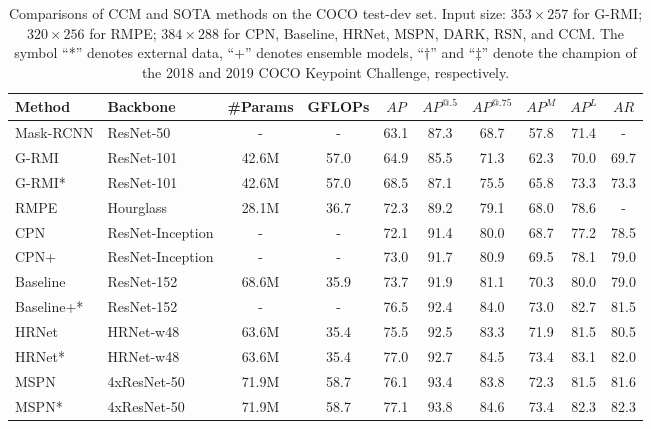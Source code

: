 \documentclass[twocolumn]{svjour3}          \smartqed  \usepackage{natbib}
\begin{document}
\begin{table*}[htbp]
\centering
  \caption{Comparisons of CCM and SOTA methods on the COCO test-dev set. Input size: $353\times257$ for G-RMI; $320\times256$ for RMPE; $384\times288$ for CPN, Baseline, HRNet, MSPN, DARK, RSN, and CCM. The symbol ``*'' denotes external data, ``+'' denotes ensemble models, ``$\dagger$'' and ``$\ddagger$'' denote the champion of the 2018 and 2019 COCO Keypoint Challenge, respectively.}
    \begin{tabular}{llcccccccc}
\toprule
      Method  & Backbone & \#Params & GFLOPs & $AP$    & $AP^{@.5}$  & $AP^{@.75}$  & $AP^M$   & $AP^L$   & $AR$ \\
    \midrule
    Mask-RCNN \citep{he2017mask} & ResNet-50 &  - & - & 63.1    &  87.3     &  68.7     &  57.8    &  71.4     & - \\
    G-RMI \citep{papandreou2017towards} & ResNet-101   &42.6M & 57.0  &64.9   & 85.5      &  71.3     &   62.3    &   70.0    &   69.7 \\
    G-RMI* \citep{papandreou2017towards} & ResNet-101  &42.6M & 57.0   &68.5    &87.1      &75.5       &  65.8     &   73.3     & 73.3 \\
    RMPE \citep{fang2017rmpe} & Hourglass & 28.1M & 36.7 &72.3      &89.2     &79.1       &68.0       &78.6         &- \\
    CPN \citep{chen2018cascaded} & ResNet-Inception & - & -   &72.1      &91.4      &80.0     &68.7        &77.2         &78.5 \\
    CPN+ \citep{chen2018cascaded} & ResNet-Inception & - & -   &73.0     & 91.7    &80.9       &69.5       &78.1         &79.0 \\
    Baseline \citep{xiao2018simple} & ResNet-152 & 68.6M & 35.9 & 73.7     &  91.9     &  81.1     &  70.3     &  80.0     & 79.0 \\
    Baseline+* \citep{xiao2018simple} & ResNet-152 & - & - & 76.5     &  92.4     &  84.0     &  73.0     & 82.7     & 81.5 \\
    HRNet \citep{sun2019deep} & HRNet-w48 & 63.6M & 35.4 & 75.5     &  92.5     &  83.3     &  71.9     &  81.5    & 80.5 \\
    HRNet* \citep{sun2019deep} & HRNet-w48 &  63.6M & 35.4 & 77.0   &  92.7     &  84.5     &  73.4     &  83.1    & 82.0 \\
    MSPN \citep{li2019rethinking} & 4xResNet-50 & 71.9M & 58.7 &76.1  &93.4      &83.8       &72.3       &81.5       &81.6 \\
    MSPN* \citep{li2019rethinking} & 4xResNet-50 & 71.9M & 58.7 &77.1  &93.8      &84.6       &73.4       &82.3       &82.3 \\

\end{tabular}
\end{table*}
\end{document}
